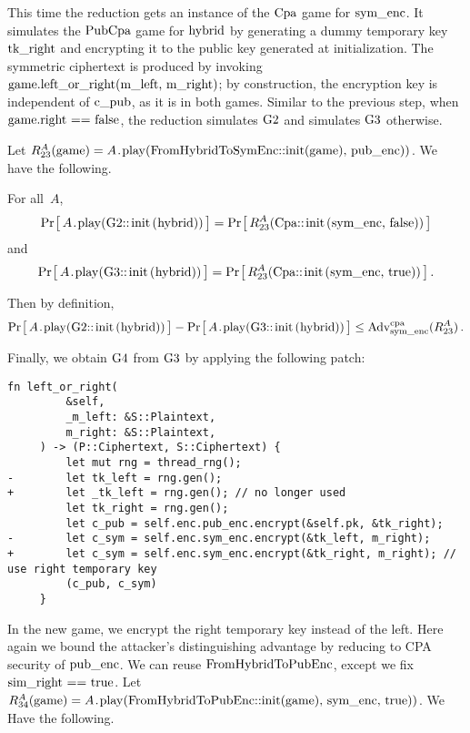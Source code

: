 %
This time the reduction gets an instance of the
\hyperref[fig/symenc/security]{$\code{Cpa}$} game for $\code{sym_enc}$. It
simulates the $\code{PubCpa}$ game for $\code{hybrid}$ by generating a dummy
temporary key $\code{tk_right}$ and encrypting it to the public key generated at
initialization. The symmetric ciphertext is produced by invoking
$\code{game.left_or_right(m_left, m_right)}$; by construction, the encryption
key is independent of $\code{c_pub}$, as it is in both games.
%
Similar to the previous step, when $\code{game.right == false}$, the reduction
simulates $\code{G2}$ and simulates $\code{G3}$ otherwise.

Let $R_{\code{23}}^A(\code{game}) =
A\code{.play(FromHybridToSymEnc::init(game), pub_enc))}$.
%
We have the following.
%

\begin{claim}
  For all~$A$,
  \[
    \Prob{A\code{.play(G2::init(hybrid))}} =
    \Prob{R_{\code{23}}^A(\code{Cpa::init(sym_enc, false)})}
  \]
  and
  \[
    \Prob{A\code{.play(G3::init(hybrid))}} =
    \Prob{R_{\code{23}}^A(\code{Cpa::init(sym_enc, true)})} \,.
  \]
\end{claim}
%
Then by definition,
%
\[
  \Prob{A\code{.play(G2::init(hybrid))}} -
  \Prob{A\code{.play(G3::init(hybrid))}} \leq
  \Adv{cpa}_\code{sym_enc}(R_{\code{23}}^A) \,.
\]

Finally, we obtain $\code{G4}$ from $\code{G3}$ by applying the following patch:
%
\begin{lstlisting}[style=patch]
    fn left_or_right(
         &self,
         _m_left: &S::Plaintext,
         m_right: &S::Plaintext,
     ) -> (P::Ciphertext, S::Ciphertext) {
         let mut rng = thread_rng();
-        let tk_left = rng.gen();
+        let _tk_left = rng.gen(); // no longer used
         let tk_right = rng.gen();
         let c_pub = self.enc.pub_enc.encrypt(&self.pk, &tk_right);
-        let c_sym = self.enc.sym_enc.encrypt(&tk_left, m_right);
+        let c_sym = self.enc.sym_enc.encrypt(&tk_right, m_right); // use right temporary key
         (c_pub, c_sym)
     }
\end{lstlisting}
%
In the new game, we encrypt the right temporary key instead of the left. Here
again we bound the attacker's distinguishing advantage by reducing to CPA
security of $\code{pub_enc}$.
%
We can reuse $\code{FromHybridToPubEnc}$, except we fix $\code{sim_right ==
true}$.
%
Let $R_{\code{34}}^A(\code{game}) =
A\code{.play(FromHybridToPubEnc::init(game), sym_enc, true))}$.
%
We Have the following.

